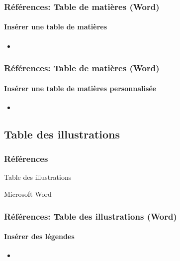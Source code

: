 \documentclass[xcolor=table]{beamer}
\begin{document}
\begin{frame}
\frametitle{Références: Table de matières (Word)}
\framesubtitle{Insérer une table de matières}

\begin{minipage}{0.59\textwidth}
	\begin{itemize}
		\item 
	\end{itemize}
\end{minipage}
\begin{minipage}{0.40\textwidth}
\end{minipage}

\end{frame}

\begin{frame}
\frametitle{Références: Table de matières (Word)}
\framesubtitle{Insérer une table de matières personnalisée}

\begin{minipage}{0.59\textwidth}
	\begin{itemize}
		\item 
	\end{itemize}
\end{minipage}
\begin{minipage}{0.40\textwidth}
	
\end{minipage}

\end{frame}

\subsection{Table des illustrations}

\begin{frame}
\frametitle{Références}

\begin{center}
	Table des illustrations 
	
	Microsoft Word
\end{center}

\end{frame}

\begin{frame}[t]
\frametitle{Références: Table des illustrations (Word)}
\framesubtitle{Insérer des légendes}

\begin{minipage}{0.61\textwidth}
	\begin{itemize}
		\item 
	\end{itemize}
\end{minipage}
\begin{minipage}{0.38\textwidth}
	
	
\end{minipage}

\end{frame}
\end{document}
